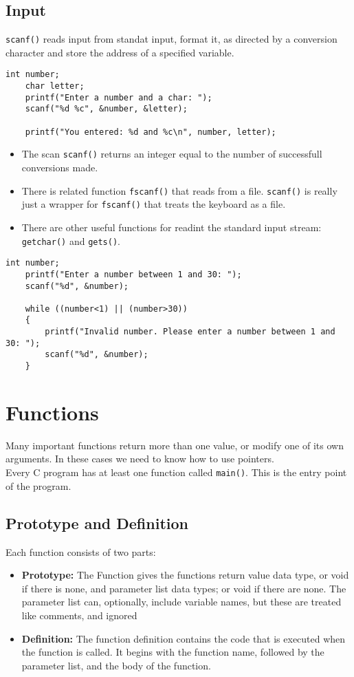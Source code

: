 \documentclass[a4paper, 10pt]{article}
\begin{document}
\subsection{Input}
\texttt{scanf()} reads input from standat input, format it, as directed by a conversion character and store the address of a specified variable.
\begin{lstlisting}[style=cStyle, caption={Reading an integer}]
    int number; 
    char letter; 
    printf("Enter a number and a char: ");
    scanf("%d %c", &number, &letter);

    printf("You entered: %d and %c\n", number, letter);
\end{lstlisting}
\begin{itemize}
    \item The scan \texttt{scanf()} returns an integer equal to the number of successfull conversions made.
    \item There is related function \texttt{fscanf()} that reads from a file. \texttt{scanf()} is really just a wrapper for \texttt{fscanf()} that treats the keyboard as a file.
    \item There are other useful functions for readint the standard input stream: \texttt{getchar()} and \texttt{gets()}.
\end{itemize}
\begin{lstlisting}[style=cStyle, caption={Check for no input}]
    int number;
    printf("Enter a number between 1 and 30: ");
    scanf("%d", &number);

    while ((number<1) || (number>30))
    {
        printf("Invalid number. Please enter a number between 1 and 30: ");
        scanf("%d", &number);
    }
\end{lstlisting}

\section{Functions}
Many important functions return more than one value, or
modify one of its own arguments. In these cases we need to know
how to use pointers. \\[2ex]
Every C program has at least one function called \texttt{main()}. This is the entry point of the program.
\subsection{Prototype and Definition}
Each function consists of two parts:
\begin{itemize}
    \item \textbf{Prototype:} The Function gives the functions return value data type, or void if there is none, and parameter list data types; or void if there are none. The parameter list can, optionally, include variable names, but
          these are treated like comments, and ignored
    \item \textbf{Definition:} The function definition contains the code that is executed when the function is called. It begins with the function name, followed by the parameter list, and the body of the function.
\end{itemize}
\end{document}
